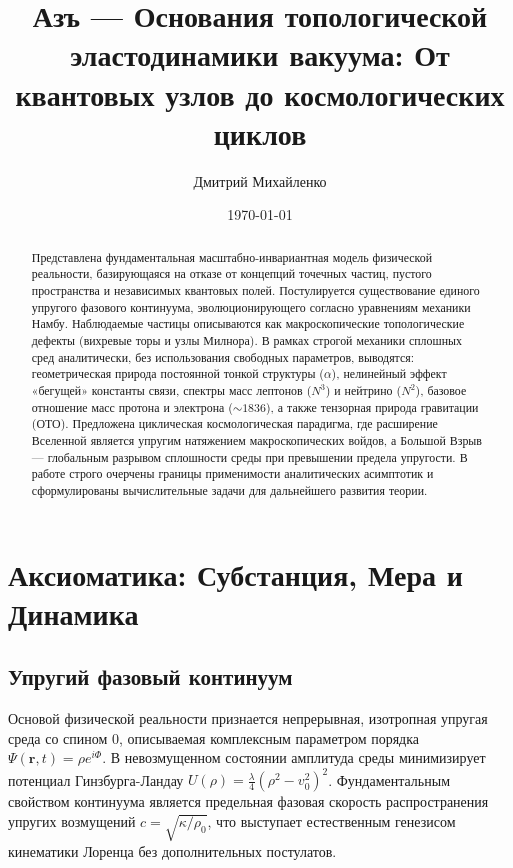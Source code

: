 \documentclass[12pt,a4paper]{article}
\title{\textbf{Азъ — Основания топологической эластодинамики вакуума: От квантовых узлов до космологических циклов}}
\author{Дмитрий Михайленко}
\date{\today}
\begin{document}
\maketitle

\begin{abstract}
Представлена фундаментальная масштабно-инвариантная модель физической реальности, базирующаяся на отказе от концепций точечных частиц, пустого пространства и независимых квантовых полей. Постулируется существование единого упругого фазового континуума, эволюционирующего согласно уравнениям механики Намбу. Наблюдаемые частицы описываются как макроскопические топологические дефекты (вихревые торы и узлы Милнора). 
В рамках строгой механики сплошных сред аналитически, без использования свободных параметров, выводятся: геометрическая природа постоянной тонкой структуры ($\alpha$), нелинейный эффект «бегущей» константы связи, спектры масс лептонов ($N^3$) и нейтрино ($N^2$), базовое отношение масс протона и электрона ($\sim 1836$), а также тензорная природа гравитации (ОТО). Предложена циклическая космологическая парадигма, где расширение Вселенной является упругим натяжением макроскопических войдов, а Большой Взрыв — глобальным разрывом сплошности среды при превышении предела упругости. В работе строго очерчены границы применимости аналитических асимптотик и сформулированы вычислительные задачи для дальнейшего развития теории.
\end{abstract}

\section{Аксиоматика: Субстанция, Мера и Динамика}

\subsection{Упругий фазовый континуум}
Основой физической реальности признается непрерывная, изотропная упругая среда со спином 0, описываемая комплексным параметром порядка $\Psi(\mathbf{r}, t) = \rho e^{i\Phi}$. В невозмущенном состоянии амплитуда среды минимизирует потенциал Гинзбурга-Ландау $U(\rho) = \frac{\lambda}{4}(\rho^2 - v_0^2)^2$. Фундаментальным свойством континуума является предельная фазовая скорость распространения упругих возмущений $c = \sqrt{\kappa / \rho_0}$, что выступает естественным генезисом кинематики Лоренца без дополнительных постулатов.
\end{document}
